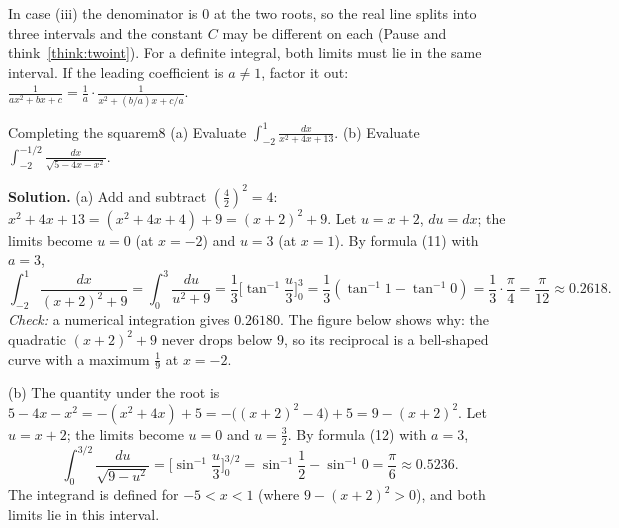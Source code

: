 \documentclass[11pt]{article}
\begin{document}
In case (iii) the denominator is $0$ at the two roots, so the real line splits into three intervals and the constant $C$ may be different on each (Pause and think~\ref{think:twoint}). For a definite integral, both limits must lie in the same interval. If the leading coefficient is $a\ne1$, factor it out: $\frac1{ax^2+bx+c}=\frac1a\cdot\frac1{x^2+(b/a)x+c/a}$.

\begin{exmp}{Completing the square}{m8}
(a) Evaluate $\int_{-2}^{1}\frac{dx}{x^2+4x+13}$. (b) Evaluate $\int_{-2}^{-1/2}\frac{dx}{\sqrt{5-4x-x^2}}$.

\textbf{Solution.} (a) Add and subtract $\left(\frac42\right)^2=4$: $x^2+4x+13=(x^2+4x+4)+9=(x+2)^2+9$. Let $u=x+2$, $du=dx$; the limits become $u=0$ (at $x=-2$) and $u=3$ (at $x=1$). By formula (11) with $a=3$,
\[\int_{-2}^1\frac{dx}{(x+2)^2+9}=\int_0^3\frac{du}{u^2+9}=\frac13\Big[\tan^{-1}\frac u3\Big]_0^3=\frac13\left(\tan^{-1}1-\tan^{-1}0\right)=\frac13\cdot\frac\pi4=\frac\pi{12}\approx0.2618 .\]
\emph{Check:} a numerical integration gives $0.26180$. The figure below shows why: the quadratic $(x+2)^2+9$ never drops below $9$, so its reciprocal is a bell-shaped curve with a maximum $\frac19$ at $x=-2$.

(b) The quantity under the root is $5-4x-x^2=-(x^2+4x)+5=-\big((x+2)^2-4\big)+5=9-(x+2)^2$. Let $u=x+2$; the limits become $u=0$ and $u=\frac32$. By formula (12) with $a=3$,
\[\int_0^{3/2}\frac{du}{\sqrt{9-u^2}}=\Big[\sin^{-1}\frac u3\Big]_0^{3/2}=\sin^{-1}\frac12-\sin^{-1}0=\frac\pi6\approx0.5236 .\]
The integrand is defined for $-5<x<1$ (where $9-(x+2)^2>0$), and both limits lie in this interval.


\end{exmp}
\end{document}
